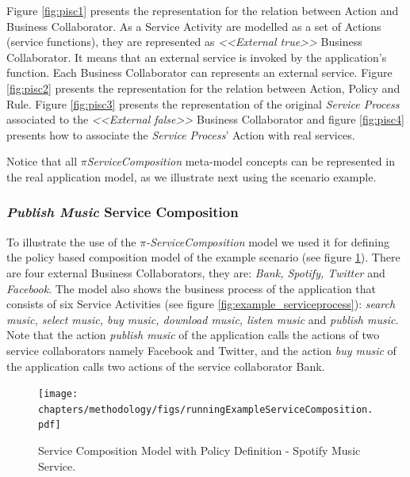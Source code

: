 Figure \ref{fig:pisc1} presents the representation for the relation between
{\sc Action} and {\sc Business Collaborator}. As a {\sc Service Activity} are
modelled as a set of {\sc Actions} (service functions), they are represented as
\textit{<<External true>>} {\sc Business Collaborator}. It means that an
external service is invoked by the application's function. Each {\sc Business
Collaborator} can represents an external service. Figure \ref{fig:pisc2}
presents the representation for the relation between {\sc Action}, {\sc Policy} and {\sc
Rule}. Figure \ref{fig:pisc3} presents the representation of the original
\textit{Service Process} associated to the \textit{<<External false>>} {\sc
Business Collaborator} and figure \ref{fig:pisc4} presents how to associate the
\textit{Service Process}' {\sc Action} with real services.

Notice that all \textit{$\pi$ServiceComposition} meta-model concepts can be
represented in the real application model, as we illustrate next using the
scenario example.

\subsubsection{\textit{Publish Music} Service Composition}

To illustrate the use of the \textit{$\pi$-ServiceComposition} model we used it for
defining the policy based composition model of the example scenario (see figure
\ref{fig:servicecompositionPolicy}). There are four external {\sc Business
Collaborators}, they are: \textit{Bank, Spotify, Twitter} and \textit{Facebook}.
The model also shows the business process of the application that consists of
six {\sc Service Activities} (see figure \ref{fig:example_serviceprocess}):
\textit{search music, select music, buy music, download music, listen music} and
\textit{publish music}. Note that the action \textit{publish music} of the
application calls the actions of two service collaborators namely Facebook and
Twitter, and the action \textit{buy music} of the application calls two actions
of the service collaborator Bank.

\begin{figure}[ht!]
\centering
\texttt{[image: chapters/methodology/figs/runningExampleServiceComposition.pdf]}
\caption{Service Composition Model with Policy Definition - Spotify Music
Service.}
\label{fig:servicecompositionPolicy}
\end{figure}


